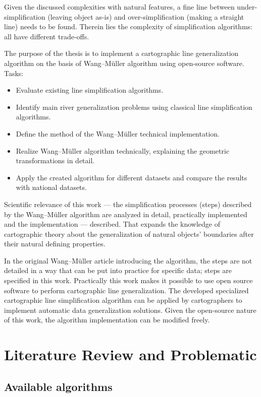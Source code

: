 \documentclass[a4paper]{article}
\newcommand{\WM}{Wang--M{\"u}ller}
\begin{document}
Given the discussed complexities with natural features, a fine line between
under-simplification (leaving object as-is) and over-simplification (making a
straight line) needs to be found. Therein lies the complexity of simplification
algorithms: all have different trade-offs.

The purpose of the thesis is to implement a cartographic line generalization
algorithm on the basis of {\WM} algorithm using open-source software. Tasks:

\begin{itemize}
    \item Evaluate existing line simplification algorithms.
    \item Identify main river generalization problems using classical line
        simplification algorithms.
    \item Define the method of the {\WM} technical implementation.
    \item Realize {\WM} algorithm technically, explaining the geometric
        transformations in detail.
    \item Apply the created algorithm for different datasets and compare
        the results with national datasets.
\end{itemize}

Scientific relevance of this work --- the simplification processes (steps)
described by the {\WM} algorithm are analyzed in detail, practically
implemented and the implementation --- described. That expands the knowledge of
cartographic theory about the generalization of natural objects' boundaries
after their natural defining properties.

In the original {\WM} article introducing the algorithm, the steps are not
detailed in a way that can be put into practice for specific data; steps are
specified in this work. Practically this work makes it possible to use open
source software to perform cartographic line generalization. The developed
specialized cartographic line simplification algorithm can be applied by
cartographers to implement automatic data generalization solutions. Given the
open-source nature of this work, the algorithm implementation can be modified
freely.

\section{Literature Review and Problematic}
\label{sec:literature-review-problematic}

\subsection{Available algorithms}
\end{document}
